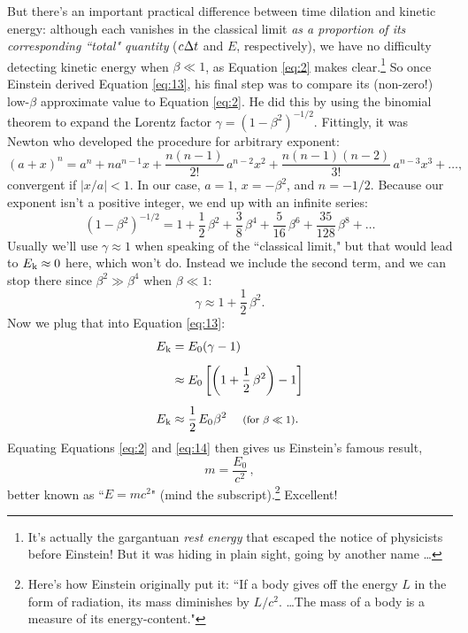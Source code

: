 \documentclass[12pt]{article}
\begin{document}
But there's an important practical difference between time dilation and kinetic energy: although each vanishes in the classical limit \emph{as a proportion of its corresponding ``total" quantity} ($c \mkern.5mu \Delta t$ and $E$, respectively), we have no difficulty detecting kinetic energy when $\beta \ll 1$, as Equation \ref{eq:2} makes clear.\footnote{It's actually the gargantuan \emph{rest energy} that escaped the notice of physicists before Einstein! But it was hiding in plain sight, going by another name \dots} So once Einstein derived Equation \ref{eq:13}, his final step was to compare its (non-zero!) low-$\beta$ approximate value to Equation \ref{eq:2}. He did this by using the binomial theorem to expand the Lorentz factor $\gamma = (1-\beta^2)^{-1/2}$. Fittingly, it was Newton who developed the procedure for arbitrary exponent:
\begin{equation*}
(a+x)^n = a^n + na^{n-1}x + \frac{n(n-1)}{2!} \, a^{n-2}x^2 + \frac{n(n-1)(n-2)}{3!} \, a^{n-3}x^3 + \dots ,
\end{equation*}
convergent if $|x/a| < 1$. In our case, $a=1$, $x=-\beta^2$, and $n=-1/2$. Because our exponent isn't a positive integer, we end up with an infinite series:
\begin{equation*}
\left(1-\beta^2\right)^{-1/2}=1 + \dfrac{1}{2}\,\beta^2 +  \frac {3}{8} \, \beta^4 + \frac{5}{16} \, \beta^6 + \frac{35}{128} \, \beta^8 + \dots
\end{equation*}
Usually we'll use $\gamma \approx 1$ when speaking of the ``classical limit," but that would lead to $E_{\mkern.5mu \textrm{k}} \approx 0$ here, which won't do. Instead we include the second term, and we can stop there since $\beta^2 \gg \beta^4$ when $\beta \ll 1$:
\begin{equation*}
\gamma \approx 1 + \dfrac{1}{2}\,\beta^2.
\end{equation*}
Now we plug that into Equation \ref{eq:13}:
\begin{equation}\label{eq:14}
\begin{split}
E_{\mkern.5mu \textrm{k}} &=E_0 (\gamma - 1)\\[5pt]
&\approx E_0 \left[ \left( 1 + \dfrac{1}{2}\,\beta^2 \right) -1 \right] \\[5pt]
E_{\mkern.5mu \textrm{k}} &\approx \frac{1}{2} \mkern2mu E_0 \mkern.5mu \beta^2 \quad \textrm{\footnotesize{ (for $\beta \ll 1$)}}.
\end{split}
\end{equation}
Equating Equations \ref{eq:2} and \ref{eq:14} then gives us Einstein's famous result,
\begin{equation}\label{eq:15}
\boxed{m = \frac{E_0}{c^2}} \, ,
\end{equation}
better known as ``$E = mc^2$" (mind the subscript).\footnote{Here's how Einstein originally put it: ``If a body gives off the energy $L$ in the form of radiation, its mass diminishes by $L / c^2$. \ldots The mass of a body is a measure of its energy-content."} Excellent!
\end{document}
